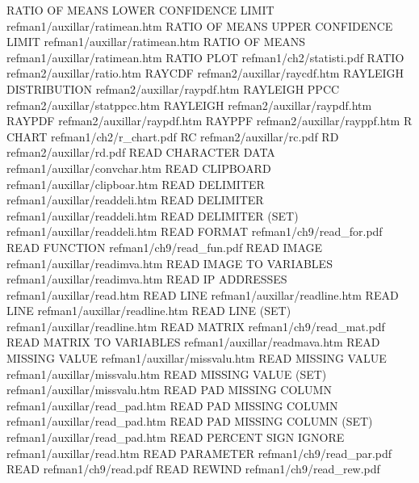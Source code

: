 RATIO OF MEANS LOWER CONFIDENCE LIMIT   refman1/auxillar/ratimean.htm
RATIO OF MEANS UPPER CONFIDENCE LIMIT   refman1/auxillar/ratimean.htm
RATIO OF MEANS                          refman1/auxillar/ratimean.htm
RATIO PLOT                              refman1/ch2/statisti.pdf
RATIO                                   refman2/auxillar/ratio.htm
RAYCDF                                  refman2/auxillar/raycdf.htm
RAYLEIGH DISTRIBUTION                   refman2/auxillar/raypdf.htm
RAYLEIGH PPCC                           refman2/auxillar/statppcc.htm
RAYLEIGH                                refman2/auxillar/raypdf.htm
RAYPDF                                  refman2/auxillar/raypdf.htm
RAYPPF                                  refman2/auxillar/rayppf.htm
R CHART                                 refman1/ch2/r_chart.pdf
RC                                      refman2/auxillar/rc.pdf
RD                                      refman2/auxillar/rd.pdf
READ CHARACTER DATA                     refman1/auxillar/convchar.htm
READ CLIPBOARD                          refman1/auxillar/clipboar.htm
READ DELIMITER                          refman1/auxillar/readdeli.htm
READ DELIMITER                          refman1/auxillar/readdeli.htm
READ DELIMITER (SET)                    refman1/auxillar/readdeli.htm
READ FORMAT                             refman1/ch9/read_for.pdf
READ FUNCTION                           refman1/ch9/read_fun.pdf
READ IMAGE                              refman1/auxillar/readimva.htm
READ IMAGE TO VARIABLES                 refman1/auxillar/readimva.htm
READ IP ADDRESSES                       refman1/auxillar/read.htm
READ LINE                               refman1/auxillar/readline.htm
READ LINE                               refman1/auxillar/readline.htm
READ LINE (SET)                         refman1/auxillar/readline.htm
READ MATRIX                             refman1/ch9/read_mat.pdf
READ MATRIX TO VARIABLES                refman1/auxillar/readmava.htm
READ MISSING VALUE                      refman1/auxillar/missvalu.htm
READ MISSING VALUE                      refman1/auxillar/missvalu.htm
READ MISSING VALUE (SET)                refman1/auxillar/missvalu.htm
READ PAD MISSING COLUMN                 refman1/auxillar/read_pad.htm
READ PAD MISSING COLUMN                 refman1/auxillar/read_pad.htm
READ PAD MISSING COLUMN (SET)           refman1/auxillar/read_pad.htm
READ PERCENT SIGN IGNORE                refman1/auxillar/read.htm
READ PARAMETER                          refman1/ch9/read_par.pdf
READ                                    refman1/ch9/read.pdf
READ REWIND                             refman1/ch9/read_rew.pdf
